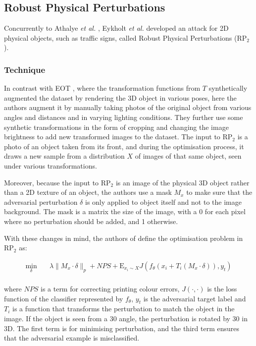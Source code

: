 \subsection{Robust Physical Perturbations}

Concurrently to Athalye \textit{et al.} \cite{athalye}, Eykholt \textit{et al.} \cite{evtimov_road_signs} developed an attack for 2D physical objects, such as traffic signs, called Robust Physical Perturbations ($\textrm{RP}_2$).

\subsubsection{Technique}

In contrast with EOT \cite{athalye}, where the transformation functions from $T$ synthetically augmented the dataset by rendering the 3D object in various poses, here the authors augment it by manually taking photos of the original object from various angles and distances and in varying lighting conditions. They further use some synthetic transformations in the form of cropping and changing the image brightness to add new transformed images to the dataset. The input to $\textrm{RP}_2$ is a photo of an object taken from its front, and during the optimisation process, it draws a new sample from a distribution $X$ of images of that same object, seen under various transformations.

Moreover, because the input to $\textrm{RP}_2$ is an image of the physical 3D object rather than a 2D texture of an object, the authors use a mask $M_x$ to make sure that the adversarial perturbation $\delta$ is only applied to object itself and not to the image background. The mask is a matrix the size of the image, with a 0 for each pixel where no perturbation should be added, and 1 otherwise. 

With these changes in mind, the authors of \cite{evtimov_road_signs} define the optimisation problem in $\textrm{RP}_2$ as:

\begin{equation}
\begin{aligned}
\min_{\delta} \quad & \lambda\|M_x \cdot \delta\|_p + NPS + \mathrm{E}_{x_i\sim X}J(f_\theta(x_i + T_i(M_x \cdot \delta)), y_t)\\
\label{eq:rp2}
\end{aligned}
\end{equation}

\noindent where $NPS$ is a term for correcting printing colour errors, $J(\cdot, \cdot)$ is the loss function of the classifier represented by $f_\theta$, $y_t$ is the adversarial target label and $T_i$ is a function that transforms the perturbation to match the object in the image. If the object is seen from a 30\degree{} angle, the perturbation is rotated by 30\degree{} in 3D. The first term is for minimising perturbation, and the third term ensures that the adversarial example is misclassified.

